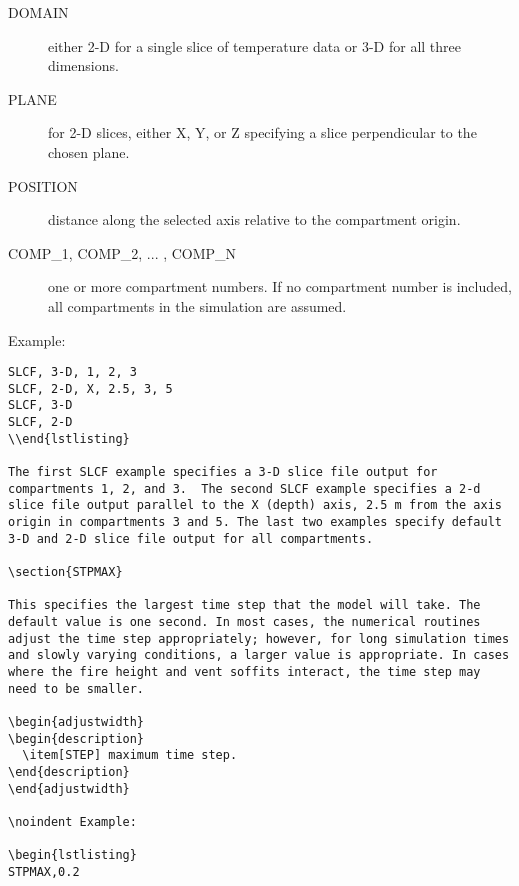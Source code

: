 \begin{adjustwidth}{1cm}{0cm}
\begin{description}
  \item[DOMAIN] either 2-D for a single slice of temperature data or 3-D for all three dimensions.
  \item[PLANE] for 2-D slices, either X, Y, or Z specifying a slice perpendicular to the chosen plane.
  \item[POSITION] distance along the selected axis relative to the compartment origin.
  \item[COMP\_1, COMP\_2, ... , COMP\_N] one or more compartment numbers. If no compartment number is included, all compartments in the simulation are assumed.
\end{description}
\end{adjustwidth}

\noindent Example:

\begin{lstlisting}
SLCF, 3-D, 1, 2, 3
SLCF, 2-D, X, 2.5, 3, 5
SLCF, 3-D
SLCF, 2-D
\\end{lstlisting}

The first SLCF example specifies a 3-D slice file output for compartments 1, 2, and 3.  The second SLCF example specifies a 2-d slice file output parallel to the X (depth) axis, 2.5 m from the axis origin in compartments 3 and 5. The last two examples specify default 3-D and 2-D slice file output for all compartments.

\section{STPMAX}

This specifies the largest time step that the model will take. The default value is one second. In most cases, the numerical routines adjust the time step appropriately; however, for long simulation times and slowly varying conditions, a larger value is appropriate. In cases where the fire height and vent soffits interact, the time step may need to be smaller.

\begin{adjustwidth}{1cm}{0cm}
\begin{description}
  \item[STEP] maximum time step.
\end{description}
\end{adjustwidth}

\noindent Example:

\begin{lstlisting}
STPMAX,0.2
\end{lstlisting}

